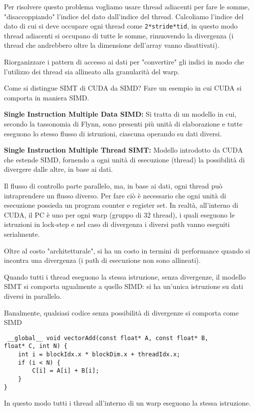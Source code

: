 \begin{questions}
\begin{solution}
        Per risolvere questo problema vogliamo usare thread adiacenti per fare le somme, "disaccoppiando" l'indice del dato dall'indice del thread. Calcoliamo l'indice del dato di cui si deve occupare ogni thread come \texttt{2*stride*tid}, in questo modo thread adiacenti si occupano di tutte le somme, rimuovendo la divergenza (i thread che andrebbero oltre la dimensione dell'array vanno disattivati).
        
        Riorganizzare i pattern di accesso ai dati per "convertire" gli indici in modo che l'utilizzo dei thread sia allineato alla granularità del warp.
    \end{solution}
    
    \question Come si distingue SIMT di CUDA da SIMD? Fare un esempio in cui CUDA si comporta in maniera SIMD.
    
    \begin{solution}
        \textbf{Single Instruction Multiple Data SIMD:} Si tratta di un modello in cui, secondo la tassonomia di Flynn, sono presenti più unità di elaborazione e tutte eseguono lo stesso flusso di istruzioni, ciascuna operando su dati diversi.  
        
        \textbf{Single Instruction Multiple Thread SIMT:} Modello introdotto da CUDA che estende SIMD, fornendo a ogni unità di esecuzione (thread) la possibilità di divergere dalle altre, in base ai dati. 
        
        Il flusso di controllo parte parallelo, ma, in base ai dati, ogni thread può intraprendere un flusso diverso. Per fare ciò è necessario che ogni unità di esecuzione possieda un program counter e register set. In realtà, all'interno di CUDA, il PC è uno per ogni warp (gruppo di 32 thread), i quali eseguono le istruzioni in lock-step e nel caso di divergenza i diversi path vanno eseguiti serialmente.
        
        Oltre al costo "architetturale", si ha un costo in termini di performance quando si incontra una divergenza (i path di esecuzione non sono allineati).
        
        Quando tutti i thread eseguono la stessa istruzione, senza divergenze, il modello SIMT si comporta ugualmente a quello SIMD: si ha un'unica istruzione su dati diversi in parallelo.
        
        Banalmente, qualsiasi codice senza possibilità di divergenze si comporta come SIMD
        \begin{verbatim}
 __global__ void vectorAdd(const float* A, const float* B, 
float* C, int N) {
    int i = blockIdx.x * blockDim.x + threadIdx.x;
    if (i < N) {
        C[i] = A[i] + B[i];
    }
}
        \end{verbatim}
        In questo modo tutti i thread all'interno di un warp eseguono la stessa istruzione.
    \end{solution}
    

\end{questions}
